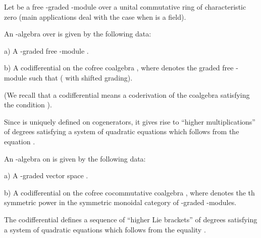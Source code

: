 \documentclass[a4paper,12pt]{article}
\begin{document}
Let \coordHE{} be a free \myHighlight{$\Z$}\coordHE{}-graded  \coordHE{}-module over a unital commutative ring \coordHE{}
of characteristic zero (main applications deal with the case when \coordHE{} is a field).

\begin{dfn}
An \myHighlight{$\A$}\coordHE{}-algebra  \coordHE{} over \coordHE{} is given by the following data:

a) A \myHighlight{$\Z$}\coordHE{}-graded free \coordHE{}-module \coordHE{}.

b) A codifferential \coordHE{} on the
cofree coalgebra
\coordHE{}, where \coordHE{} denotes
the graded free \coordHE{}-module such that \coordHE{} (\coordHE{} with
shifted grading).

(We recall that a codifferential means a coderivation \coordHE{}
of the coalgebra satisfying the condition \coordHE{}).

\end{dfn}

Since \coordHE{} is uniquely defined on cogenerators,
it gives rise to ``higher multiplications''
\coordHE{} of degrees \coordHE{} satisfying a
system of quadratic equations which follows from the equation
\coordHE{}.

\begin{dfn}

An \coordHE{}-algebra on \coordHE{} 
is given by the following data:

a) A \myHighlight{$\Z$}\coordHE{}-graded vector space \coordHE{}.

b) A  codifferential
on the cofree cocommutative coalgebra 
\coordHE{}, where \coordHE{} denotes the 
\coordHE{}th symmetric power in the symmetric monoidal category of \myHighlight{$\Z$}\coordHE{}-graded \coordHE{}-modules.

\end{dfn}

The codifferential \coordHE{} defines a sequence of ``higher Lie brackets''
\coordHE{} of degrees \coordHE{} satisfying a system
of quadratic equations which  follows
from the equality \coordHE{}.
\end{document}
